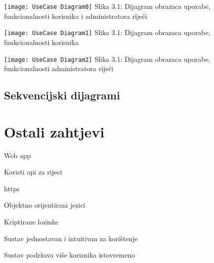 
					\texttt{[image: UseCase Diagram0]}
					Slika 3.1: Dijagram obrazaca uporabe, funkcionalnosti korisnika i administratora riječi
					
					\texttt{[image: UseCase Diagram1]}
					Slika 3.1: Dijagram obrazaca uporabe, funkcionalnosti korisnika
					
					\texttt{[image: UseCase Diagram2]}
					Slika 3.1: Dijagram obrazaca uporabe, funkcionalnosti administratora riječi
				
			\subsection{Sekvencijski dijagrami}
				
%				
	
		\section{Ostali zahtjevi}
		
			\begin{packed_enum}
				
				\item Web app
				\item Koristi api za rijeci
				\item https
				\item Objektno orijentirani jezici
				\item Kriptirane lozinke
				\item Sustav jednostavan i intuitivan za korištenje
				\item Sustav podržava više korisnika istovremeno
				
			\end{packed_enum}
		
%		 
			 
			 
			 
	
